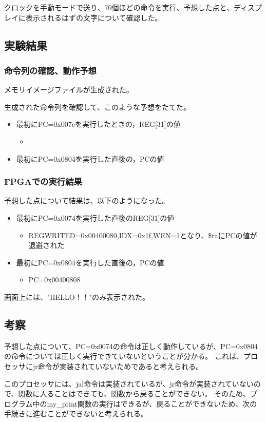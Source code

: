 クロックを手動モードで送り、70個ほどの命令を実行、予想した点と、ディスプレイに表示されるはずの文字について確認した。

\subsection{実験結果}
\subsubsection{命令列の確認、動作予想}
メモリイメージファイルが生成された。
% 

生成された命令列を確認して、このような予想をたてた。
\begin{itemize}
  \item 最初にPC=0x007cを実行したときの，REG[31]の値
        \begin{itemize}
          \item 
        \end{itemize}
  \item 最初にPC=0x0804を実行した直後の，PCの値
\end{itemize}

\subsubsection{FPGAでの実行結果}
予想した点について結果は、以下のようになった。
\begin{itemize}
  \item 最初にPC=0x0074を実行した直後のREG[31]の値
        \begin{itemize}
          \item REGWRITED=0x00400080,IDX=0x1f,WEN=1となり、\$raにPCの値が退避された
        \end{itemize}
  \item 最初にPC=0x0804を実行した直後の，PCの値
        \begin{itemize}
          \item PC=0x00400808
        \end{itemize}
\end{itemize}

画面上には、"HELLO！！"のみ表示された。

\subsection{考察}
予想した点について、PC=0x0074の命令は正しく動作しているが、PC=0x0804の命令については正しく実行できていないということが分かる。
これは、プロセッサにjr命令が実装されていないためであると考えられる。

このプロセッサには、jal命令は実装されているが、jr命令が実装されていないので、関数に入ることはできても、関数から戻ることができない。
そのため、プログラム中のmy\_print関数の実行はできるが、戻ることができないため、次の手続きに進むことができないと考えられる。
